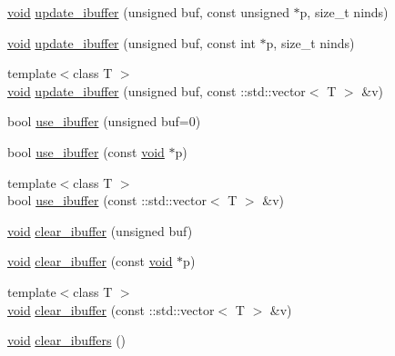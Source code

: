 \begin{DoxyCompactItemize}
\item 
\hyperlink{namespacetrimesh_a784ddfd979e1c579bda795a8edfc3f43}{void} \hyperlink{classtrimesh_1_1GLManager_a89dde9710b34ab4e04f285cfac605dfa}{update\+\_\+ibuffer} (unsigned buf, const unsigned $\ast$p, size\+\_\+t ninds)
\item 
\hyperlink{namespacetrimesh_a784ddfd979e1c579bda795a8edfc3f43}{void} \hyperlink{classtrimesh_1_1GLManager_aa18449c5b67746b795a1ff500f60b402}{update\+\_\+ibuffer} (unsigned buf, const int $\ast$p, size\+\_\+t ninds)
\item 
{\footnotesize template$<$class T $>$ }\\\hyperlink{namespacetrimesh_a784ddfd979e1c579bda795a8edfc3f43}{void} \hyperlink{classtrimesh_1_1GLManager_a19b3916af0c43804c19a9ad51ec19d00}{update\+\_\+ibuffer} (unsigned buf, const \+::std\+::vector$<$ T $>$ \&v)
\item 
bool \hyperlink{classtrimesh_1_1GLManager_ab760b924580580ef713131aec72cc8b1}{use\+\_\+ibuffer} (unsigned buf=0)
\item 
bool \hyperlink{classtrimesh_1_1GLManager_a3c5729f4a96f9da1ef9bea808b6083ca}{use\+\_\+ibuffer} (const \hyperlink{namespacetrimesh_a784ddfd979e1c579bda795a8edfc3f43}{void} $\ast$p)
\item 
{\footnotesize template$<$class T $>$ }\\bool \hyperlink{classtrimesh_1_1GLManager_a38693672fc508e7755c951fefda1017e}{use\+\_\+ibuffer} (const \+::std\+::vector$<$ T $>$ \&v)
\item 
\hyperlink{namespacetrimesh_a784ddfd979e1c579bda795a8edfc3f43}{void} \hyperlink{classtrimesh_1_1GLManager_adafe4c02fd38b1c67411099f55736ee6}{clear\+\_\+ibuffer} (unsigned buf)
\item 
\hyperlink{namespacetrimesh_a784ddfd979e1c579bda795a8edfc3f43}{void} \hyperlink{classtrimesh_1_1GLManager_a8cc815851575a9bebdd8abaaf1984a4a}{clear\+\_\+ibuffer} (const \hyperlink{namespacetrimesh_a784ddfd979e1c579bda795a8edfc3f43}{void} $\ast$p)
\item 
{\footnotesize template$<$class T $>$ }\\\hyperlink{namespacetrimesh_a784ddfd979e1c579bda795a8edfc3f43}{void} \hyperlink{classtrimesh_1_1GLManager_a8c3fbeb6e62b06319fb30fe0fb1e794d}{clear\+\_\+ibuffer} (const \+::std\+::vector$<$ T $>$ \&v)
\item 
\hyperlink{namespacetrimesh_a784ddfd979e1c579bda795a8edfc3f43}{void} \hyperlink{classtrimesh_1_1GLManager_af25fdbc71ba82a2e81f58b75cc51e0ab}{clear\+\_\+ibuffers} ()
\item 

\end{DoxyCompactItemize}
